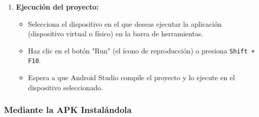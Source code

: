 \documentclass{article}
\begin{document}
\begin{enumerate}
        \item \textbf{Ejecución del proyecto:}
            \begin{itemize}
                \item Selecciona el dispositivo en el que deseas ejecutar la aplicación (dispositivo virtual o físico) en la barra de herramientas.
                \item Haz clic en el botón "Run" (el ícono de reproducción) o presiona \texttt{Shift + F10}.
                \item Espera a que Android Studio compile el proyecto y lo ejecute en el dispositivo seleccionado.
            \end{itemize}
    \end{enumerate}

    \subsubsection{Mediante la APK Instalándola}
\end{document}
